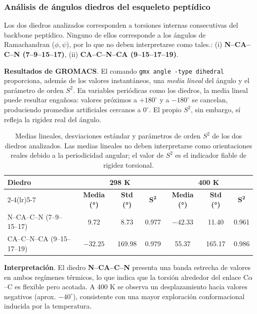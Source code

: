 \documentclass[12pt,a4paper]{article}
\begin{document}
\subsubsection*{Análisis de ángulos diedros del esqueleto peptídico}

Los dos diedros analizados corresponden a torsiones internas consecutivas del backbone peptídico. Ninguno de ellos corresponde a los ángulos de Ramachandran
(\(\phi,\psi\)), por lo que no deben interpretarse como tales.:  
(i) \textbf{N--CA--C--N (7--9--15--17)},  
(ii) \textbf{CA--C--N--CA (9--15--17--19)}.

\noindent\textbf{Resultados de GROMACS}.  
El comando \texttt{gmx angle -type dihedral} proporciona, además de los valores
instantáneos, una \emph{media lineal} del ángulo y el parámetro de orden \(S^{2}\).
En variables periódicas como los diedros, la media lineal puede resultar
engañosa: valores próximos a \(+180^\circ\) y a \(-180^\circ\) se cancelan,
produciendo promedios artificiales cercanos a \(0^\circ\). El propio \(S^{2}\),
sin embargo, sí refleja la rigidez real del ángulo.

\begin{table}[H]
\centering
\small
\begin{tabular}{lcccccc}
\toprule
\multirow{2}{*}{\textbf{Diedro}} 
& \multicolumn{3}{c}{\textbf{298 K}} 
& \multicolumn{3}{c}{\textbf{400 K}} \\
\cmidrule(lr){2-4}\cmidrule(lr){5-7}
& \textbf{Media (°)} & \textbf{Std (°)} & $\mathbf{S^{2}}$ 
& \textbf{Media (°)} & \textbf{Std (°)} & $\mathbf{S^{2}}$ \\
\midrule
N--CA--C--N (7--9--15--17)    
&   9.72  &  8.73   & 0.977  
& $-42.33$ & 11.40  & 0.961 \\
CA--C--N--CA (9--15--17--19)  
& $-32.25$ & 169.98 & 0.979  
&   55.37  & 165.17 & 0.986 \\
\bottomrule
\end{tabular}
\caption{Medias lineales, desviaciones estándar y parámetros de orden $S^2$ de los dos diedros analizados. Las medias lineales no deben interpretarse como orientaciones reales debido a la periodicidad angular; el valor de $S^2$ es el indicador fiable de rigidez torsional.}
\end{table}

\noindent\textbf{Interpretación}.  
El diedro \textbf{N--CA--C--N} presenta una banda estrecha de valores en ambos
regímenes térmicos, lo que indica que la torsión alrededor del enlace C$\alpha$--C es
flexible pero acotada. A 400 K se observa un desplazamiento hacia valores
negativos (aprox. \(-40^\circ\)), consistente con una mayor exploración
conformacional inducida por la temperatura.
\end{document}
